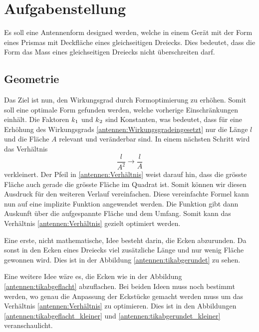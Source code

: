 %
%
% 
%
%

\section{Aufgabenstellung\label{antennen:problemstellung}}
 Es soll eine Antennenform designed werden, welche in einem Gerät mit der Form 
 eines Prismas mit Deckfläche eines gleichseitigen Dreiecks. Dies bedeutet, dass 
 die Form das Mass eines gleichseitigen Dreiecks nicht überschreiten darf.
 
\subsection{Geometrie\label{antennen:Geom}}
Das Ziel ist nun, den Wirkungsgrad durch Formoptimierung zu erhöhen. Somit soll eine optimale Form
gefunden werden, welche vorherige Einschränkungen einhält.
Die Faktoren $k\textsubscript{1}$ und $k\textsubscript{2}$ sind Konstanten, 
was bedeutet, dass für eine Erhöhung des Wirkungsgrads \eqref{antennen:Wirkungsgradeingesetzt} nur die Länge 
$l$ und die Fläche $A$ relevant und veränderbar sind. In einem nächsten Schritt wird das Verhältnis
\begin{equation}
	\frac{l}{A^2} \rightarrow \frac{l}{A}
	\label{antennen:Verhältnis}
\end{equation}
verkleinert. 
Der Pfeil in \eqref{antennen:Verhältnis} weist darauf hin, dass die grösste Fläche auch gerade die grösste Fläche im Quadrat ist. Somit können wir diesen Ausdruck 
für den weiteren Verlauf vereinfachen. Diese vereinfachte Formel kann nun auf eine implizite 
Funktion angewendet werden. Die Funktion gibt dann Auskunft über die aufgespannte Fläche und 
dem Umfang. Somit kann das Verhältnis \eqref{antennen:Verhältnis} gezielt optimiert werden. 

Eine erste, nicht mathematische, Idee besteht darin, die Ecken abzurunden. Da sonst in den Ecken
eines Dreiecks viel zusätzliche Länge und nur wenig Fläche gewonnen wird. Dies ist in der Abbildung
\ref{antennen:tikabgerundet} zu sehen. 

Eine weitere Idee wäre es, die Ecken wie in der Abbildung \ref{antennen:tikabgeflacht} abzuflachen. Bei
beiden Ideen muss noch bestimmt werden, wo genau die Anpassung der Eckstücke gemacht werden muss um 
das Verhältnis \eqref{antennen:Verhältnis} zu optimieren. Dies ist in den Abbildungen 
\ref{antennen:tikabgeflacht_kleiner} und \ref{antennen:tikabgerundet_kleiner} veranschaulicht.

